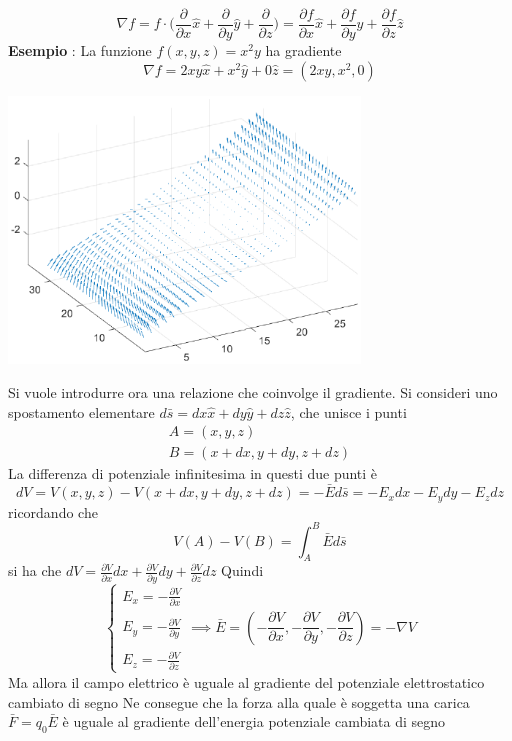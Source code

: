 \documentclass[10pt, letterpaper]{report}
\begin{document}
$$ \nabla f = f\cdot\Big( 
    \dfrac{\partial}{\partial x}\hat x+\dfrac{\partial}{\partial y}\hat y+\dfrac{\partial}{\partial z}    
\Big)= \dfrac{\partial f}{\partial x}\hat x+\dfrac{\partial f}{\partial y}\hat y+\dfrac{\partial f}{\partial z}\hat z$$
\textbf{Esempio} : La funzione $f(x,y,z)=x^2y$ ha gradiente 
$$ \nabla f = 2xy\hat x + x^2\hat y + 0\hat z = (2xy,x^2,0) $$
\begin{center}
    \includegraphics[width=0.7\textwidth]{images/grad.eps}
\end{center}
Si vuole introdurre ora una relazione che coinvolge il gradiente. Si consideri uno spostamento elementare $d\bar s = dx \hat x + dy\hat y +dz\hat z$, che unisce i punti 
$$\begin{matrix}
    A = (x,y,z)\\ 
    B= (x+dx,y+dy,z+dz)
\end{matrix}$$ 
La differenza di potenziale infinitesima in questi due punti è 
$$ dV=V(x,y,z)-V(x+dx,y+dy,z+dz)=-\bar E d\bar s = -E_x dx - E_y dy - E_z dz$$
ricordando che 
$$ V(A)-V(B)=\int_A^B \bar E d\bar s$$ 
si ha che 
$dV=\frac{\partial V}{\partial x}dx+\frac{\partial V}{\partial y}dy+\frac{\partial V}{\partial z}dz$
Quindi 
$$ \begin{cases}
    E_x=-\displaystyle\frac{\partial V}{\partial x}\\  \\
    E_y=-\displaystyle\frac{\partial V}{\partial y}\\  \\
    E_z=-\displaystyle\frac{\partial V}{\partial z}
\end{cases}\implies \bar E = (-\frac{\partial V}{\partial x},-\frac{\partial V}{\partial y},-\frac{\partial V}{\partial z})=-\nabla V$$
Ma allora il campo elettrico è uguale al gradiente del potenziale elettrostatico cambiato di segno
Ne consegue che la forza alla quale è soggetta una carica $\bar F = q_0\bar E$ è uguale al gradiente dell'energia potenziale cambiata di segno 
\end{document}
